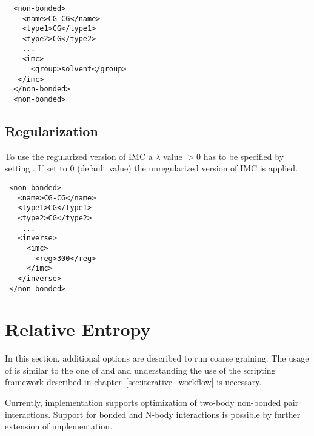 \begin{lstlisting}
  <non-bonded>
    <name>CG-CG</name>
    <type1>CG</type1>
    <type2>CG</type2>
    ...
    <imc>
      <group>solvent</group>
   </imc>
  </non-bonded>
  <non-bonded>
\end{lstlisting}

\subsection{Regularization}

To use the regularized version of IMC a $\lambda$ value $>0$ has to be specified by setting . 
If set to $0$ (default value) the unregularized version of IMC is applied.
\begin{lstlisting}
 <non-bonded>
   <name>CG-CG</name>
   <type1>CG</type1>
   <type2>CG</type2>
    ...
   <inverse>
     <imc>
       <reg>300</reg>
     </imc>
   </inverse>
 </non-bonded>
\end{lstlisting}

\section{Relative Entropy}
\label{sec:iterative_methods_re}
In this section, additional options are described to run \re coarse
graining. The usage of \re is similar to the one of \ibi and \imc and
understanding the use of the scripting framework described in
chapter~\ref{sec:iterative_workflow} is necessary.

Currently, \re implementation supports optimization of two-body
non-bonded pair interactions. Support for bonded and N-body interactions is
possible by further extension of \re implementation.

